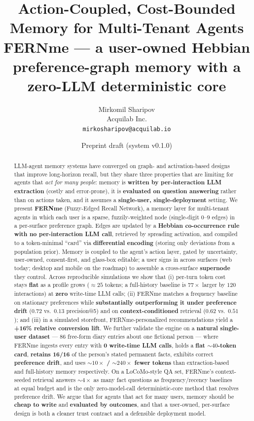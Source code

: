 \documentclass[11pt]{article}
\title{\textbf{Action-Coupled, Cost-Bounded Memory for Multi-Tenant Agents}\\[4pt]
\large FERNme --- a user-owned Hebbian preference-graph memory with a zero-LLM deterministic core}
\author{Mirkomil Sharipov\\ Acquilab Inc.\\ \texttt{mirkosharipov@acquilab.io}}
\date{Preprint draft (system v0.1.0)}
\begin{document}
\maketitle

\begin{abstract}
\noindent LLM-agent memory systems have converged on graph- and activation-based
designs that improve long-horizon recall, but they share three properties that are
limiting for agents that \emph{act for many people}: memory is \textbf{written by
per-interaction LLM extraction} (costly and error-prone), it is \textbf{evaluated on
question answering} rather than on actions taken, and it assumes a
\textbf{single-user, single-deployment} setting. We present \textbf{FERNme}
(Fuzzy-Edged Recall Network), a memory layer for multi-tenant agents in which each
user is a sparse, fuzzily-weighted node (single-digit $0$--$9$ edges) in a per-surface
preference graph. Edges are updated by a \textbf{Hebbian co-occurrence rule with no
per-interaction LLM call}, retrieved by spreading activation, and compiled to a
token-minimal ``card'' via \textbf{differential encoding} (storing only deviations
from a population prior). Memory is coupled to the agent's action layer, gated by
uncertainty, user-owned, consent-first, and glass-box editable; a user signs in across
surfaces (web today; desktop and mobile on the roadmap) to assemble a cross-surface
\textbf{supernode} they control. Across reproducible simulations we show that (i)
per-turn token cost stays \textbf{flat} as a profile grows ($\approx 25$ tokens; a
full-history baseline is $77\times$ larger by $120$ interactions) at \textbf{zero}
write-time LLM calls; (ii) FERNme matches a frequency baseline on stationary
preferences while \textbf{substantially outperforming it under preference drift}
($0.72$ vs.\ $0.13$ precision@5) and on \textbf{context-conditioned} retrieval ($0.62$
vs.\ $0.51$); and (iii) in a simulated storefront, FERNme-personalized recommendations
yield a \textbf{+16\% relative conversion lift}. We further validate the engine on a
\textbf{natural single-user dataset} --- 86 free-form diary entries about one fictional
person --- where FERNme ingests every entry with \textbf{0 write-time LLM calls}, holds
a \textbf{flat ${\sim}40$-token card}, \textbf{retains 16/16} of the person's stated
permanent facts, exhibits correct \textbf{preference drift}, and uses \textbf{${\sim}10\times$
/ ${\sim}240\times$ fewer tokens} than extraction-based and full-history memory
respectively. On a LoCoMo-style QA set, FERNme's context-seeded retrieval answers
\textbf{${\sim}4\times$} as many fact questions as frequency/recency baselines at equal
budget and is the only zero-model-call deterministic-core method that resolves preference drift. We argue that for
agents that act for many users, memory should be \textbf{cheap to write} and
\textbf{evaluated by outcomes}, and that a user-owned, per-surface design is both a
cleaner trust contract and a defensible deployment model.
\end{abstract}
\end{document}
